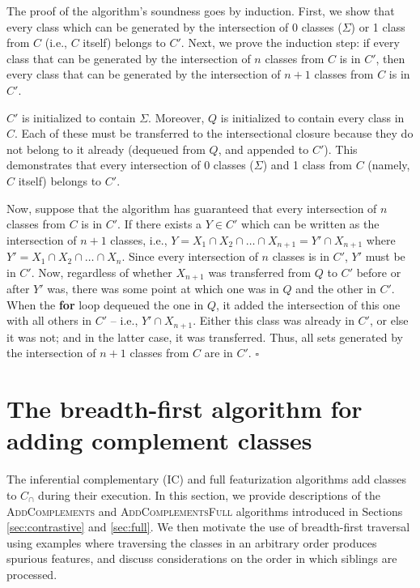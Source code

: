 \documentclass[12pt, oneside]{article}   	%
\begin{document}
\noindent The proof of the algorithm's soundness goes by induction. First, we show that every class which can be generated by the intersection of $0$ classes ($\Sigma$) or 1 class from $C$ (i.e., $C$ itself) belongs to $C'$. Next, we prove the induction step: if every class that can be generated by the intersection of $n$ classes from $C$ is in $C'$, then every class that can be generated by the intersection of $n+1$ classes from $C$ is in $C'$.

$C'$ is initialized to contain $\Sigma$. Moreover, $Q$ is initialized to contain every class in $C$. Each of these must be transferred to the intersectional closure because they do not belong to it already (dequeued from $Q$, and appended to $C'$). This demonstrates that every intersection of 0 classes ($\Sigma$) and 1 class from $C$ (namely, $C$ itself) belongs to $C'$.

Now, suppose that the algorithm has guaranteed that every intersection of $n$ classes from $C$ is in $C'$. If there exists a $Y \in C'$ which can be written as the intersection of $n+1$ classes, i.e., $Y = X_1 \cap X_2 \cap \ldots \cap X_{n+1} = Y' \cap X_{n+1}$ where $Y' = X_1 \cap X_2 \cap \ldots \cap X_n$. Since every intersection of $n$ classes is in $C'$, $Y'$ must be in $C'$. Now, regardless of whether $X_{n+1}$ was transferred from $Q$ to $C'$ before or after $Y'$ was, there was some point at which one was in $Q$ and the other in $C'$. When the \textbf{for} loop dequeued the one in $Q$, it added the intersection of this one with all others in $C'$ -- i.e., $Y' \cap X_{n+1}$. Either this class was already in $C'$, or else it was not; and in the latter case, it was transferred. Thus, all sets generated by the intersection of $n+1$ classes from $C$ are in $C'$. $\square$


\section{The breadth-first algorithm for adding complement classes}
\label{app:complements}

The inferential complementary (IC) and full featurization algorithms add classes to $C_\cap$ during their execution. In this section, we provide descriptions of the \textsc{AddComplements} and \textsc{AddComplementsFull} algorithms introduced in Sections \ref{sec:contrastive} and \ref{sec:full}. We then motivate the use of breadth-first traversal using examples where traversing the classes in an arbitrary order produces spurious features, and discuss considerations on the order in which siblings are processed.
\end{document}
